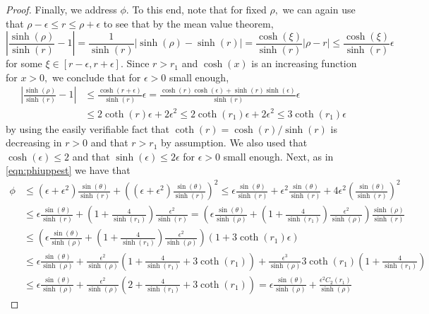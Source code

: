 \documentclass[a4paper,12pt]{article}
\begin{document}
\begin{proof}
Finally, we address $\phi.$ To this end, note that for fixed $\rho,$ 
we can again use that $\rho-\epsilon \leq r \leq \rho +\epsilon$ to 
see that by the mean value theorem,
\[
\left|\frac{\sinh(\rho)}{\sinh(r)}-1\right|
=\frac{1}{\sinh(r)} |\sinh(\rho)-\sinh(r)|
=\frac{\cosh(\xi)}{\sinh(r)}|\rho-r|
\leq\frac{\cosh(\xi)}{\sinh(r)} \epsilon
\]
for some $\xi\in [r-\epsilon,r+\epsilon].$ Since $r>r_1$ 
and $\cosh(x)$ is an increasing function for $x>0,$ we conclude that for 
$\epsilon>0$ small enough,
\begin{align} \label{eqn:sinhratio}
\left|\frac{\sinh(\rho)}{\sinh(r)}-1\right|
& \leq\frac{\cosh(r+\epsilon)}{\sinh(r)} \epsilon
=\frac{\cosh(r) \cosh(\epsilon)+\sinh(r)\sinh(\epsilon)}{\sinh(r)} \epsilon \\
& \leq 2\coth(r)\epsilon+2\epsilon^2 
\leq 2\coth(r_1)\epsilon+2\epsilon^2 
\leq 3\coth(r_1)\epsilon
\nonumber
\end{align}
by using the easily verifiable fact that $\coth(r)=\cosh(r)/\sinh(r)$ is decreasing in $r>0$
and that $r>r_1$ by assumption. We also used that $\cosh(\epsilon)\leq 2$ and that 
$\sinh(\epsilon)\leq 2 \epsilon$ for $\epsilon>0$ small enough.
Next, as in \eqref{eqn:phiuppest} we have that 
\begin{align*} 
 \phi& \leq (\epsilon+\epsilon^2)\frac{\sin(\theta)}{\sinh(r)}
+\left((\epsilon+\epsilon^2)\frac{\sin(\theta)}{\sinh(r)}\right)^2
\leq \epsilon\frac{\sin(\theta)}{\sinh(r)} +\epsilon^{2}\frac{\sin(\theta)}{\sinh(r)} 
+4\epsilon^2\left(\frac{\sin(\theta)}{\sinh(r)} \right)^2\\
& \leq \epsilon\frac{\sin(\theta)}{\sinh(r)}
+\left(1+\frac{4}{\sinh(r_1)}\right)\frac{\epsilon^2}{\sinh(r)}
=\left(\epsilon\frac{\sin(\theta)}{\sinh(\rho)}
+\left(1+\frac{4}{\sinh(r_1)}\right)\frac{\epsilon^2}{\sinh(\rho)}\right)\frac{\sinh(\rho)}{\sinh(r)}
\nonumber \\
& \leq \left(\epsilon\frac{\sin(\theta)}{\sinh(\rho)}
+\left(1+\frac{4}{\sinh(r_1)}\right)\frac{\epsilon^2}{\sinh(\rho)}\right)
\left(1+3\coth(r_1)\epsilon\right) \\
& \leq  \epsilon\frac{\sin(\theta)}{\sinh(\rho)}
+\frac{\epsilon^2}{\sinh(\rho)}\left(1+\frac{4}{\sinh(r_1)}+3\coth(r_1)\right)
+\frac{\epsilon^3}{\sinh(\rho)}3\coth(r_1)\left(1+\frac{4}{\sinh(r_1)}\right)
\nonumber \\
& \leq \epsilon\frac{\sin(\theta)}{\sinh(\rho)}
+\frac{\epsilon^2}{\sinh(\rho)}\left(2+\frac{4}{\sinh(r_1)}+3\coth(r_1)\right)
=\epsilon\frac{\sin(\theta)}{\sinh(\rho)}
+\frac{\epsilon^2C_2(r_1)}{\sinh(\rho)}

\end{align*}
\end{proof}
\end{document}

